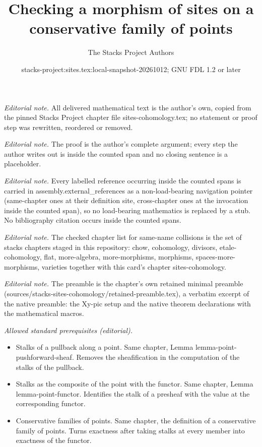 \documentclass[10pt,a4paper]{amsart}
\title{Checking a morphism of sites on a conservative family of points}
\author{The Stacks Project Authors}
\date{stacks-project:sites.tex:local-snapshot-20261012; GNU FDL 1.2 or later}
\theoremstyle{plain}
\theoremstyle{definition}
\theoremstyle{remark}
\numberwithin{equation}{subsection}
\begin{document}
\maketitle
\noindent\textit{Editorial note.} All delivered mathematical text is the author's own, copied from the pinned Stacks Project chapter file sites-cohomology.tex; no statement or proof step was rewritten, reordered or removed.\par\medskip
\noindent\textit{Editorial note.} The proof is the author's complete argument; every step the author writes out is inside the counted span and no closing sentence is a placeholder.\par\medskip
\noindent\textit{Editorial note.} Every labelled reference occurring inside the counted spans is carried in assembly.external\_references as a non-load-bearing navigation pointer (same-chapter ones at their definition site, cross-chapter ones at the invocation inside the counted span), so no load-bearing mathematics is replaced by a stub. No bibliography citation occurs inside the counted spans.\par\medskip
\noindent\textit{Editorial note.} The checked chapter list for same-name collisions is the set of stacks chapters staged in this repository: chow, cohomology, divisors, etale-cohomology, flat, more-algebra, more-morphisms, morphisms, spaces-more-morphisms, varieties together with this card's chapter sites-cohomology.\par\medskip
\noindent\textit{Editorial note.} The preamble is the chapter's own retained minimal preamble (sources/stacks-sites-cohomology/retained-preamble.tex), a verbatim excerpt of the native preamble: the Xy-pic setup and the native theorem declarations with the mathematical macros.\par\medskip
\noindent\textit{Allowed standard prerequisites (editorial).}\begin{itemize}
\item Stalks of a pullback along a point. Same chapter, Lemma lemma-point-pushforward-sheaf. Removes the sheafification in the computation of the stalks of the pullback.
\item Stalks as the composite of the point with the functor. Same chapter, Lemma lemma-point-functor. Identifies the stalk of a presheaf with the value at the corresponding functor.
\item Conservative families of points. Same chapter, the definition of a conservative family of points. Turns exactness after taking stalks at every member into exactness of the functor.
\end{itemize}\medskip
\end{document}
